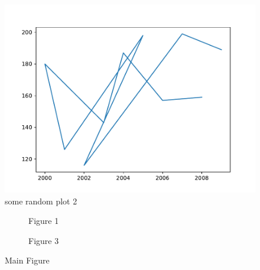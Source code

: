 \documentclass[14pt, twoside]{report}
\begin{document}
\begin{figure}[h]
	\centering
	\includegraphics[height=0.3\textheight, keepaspectratio]{images/plot1.pdf}
	\caption{some random plot 2}
	\label{fig2}
\end{figure}

\begin{figure}[h]
	\begin{subfigure}{0.5\textwidth}
		
		\caption{Figure 1}
	\end{subfigure}
	\begin{subfigure}{0.4\textwidth}
		
		\caption{Figure 3}
	\end{subfigure}
	\caption{Main Figure}
\end{figure}
	
\end{document}
